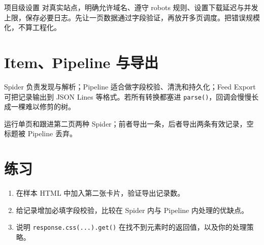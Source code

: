 \begin{method}{项目级设置}
对真实站点，明确允许域名、遵守 robots 规则、设置下载延迟与并发上限，保存必要日志。先让一页数据通过字段验证，再放开多页调度。把错误规模化，不算工程化。
\end{method}

\section{Item、Pipeline 与导出}
Spider 负责发现与解析；Pipeline 适合做字段校验、清洗和持久化；Feed Export 可把记录输出到 JSON Lines 等格式。若所有转换都塞进 \texttt{parse()}，回调会慢慢长成一棵难以修剪的树。

\begin{tcolorbox}[title=本章验收,colframe=Teal,colback=Teal!3]
运行单页和跟进第二页两种 Spider；前者导出一条，后者导出两条有效记录，空标题被 Pipeline 丢弃。
\end{tcolorbox}

\section{练习}
\begin{enumerate}[label=\arabic*.]
\item 在样本 HTML 中加入第二张卡片，验证导出记录数。
\item 给记录增加必填字段校验，比较在 Spider 内与 Pipeline 内处理的优缺点。
\item 说明 \texttt{response.css(...).get()} 在找不到元素时的返回值，以及你的处理策略。
\end{enumerate}
